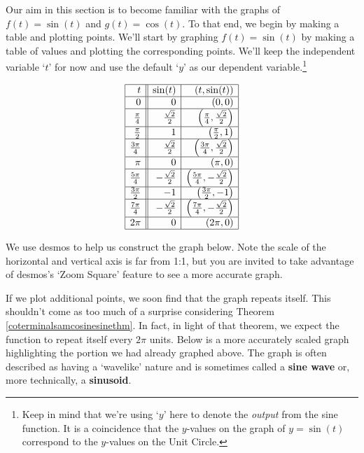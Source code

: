 \documentclass{ximera}
\begin{document}



Our aim in this section is to become familiar with the graphs of $f(t) = \sin(t)$ and $g(t) = \cos(t)$.  To that end, we begin by making a table and plotting points.  We'll start by graphing $f(t) = \sin(t)$ by making a table of values and plotting the corresponding points.  We'll keep the independent variable `$t$' for now and use the default `$y$' as our dependent variable.\footnote{Keep in mind that we're using `$y$' here to denote the \textit{output} from the sine function.  It is a coincidence that the $y$-values on the graph of $y=\sin(t)$ correspond to the $y$-values on the Unit Circle.}  

\[ \begin{array}{|r||r|r|} \hline
t & \sin(t) & (t,\sin(t)) \\ \hline
0  & 0 & (0, 0) \\ \hline
\frac{\pi}{4}  & \frac{\sqrt{2}}{2} & \left(\frac{\pi}{4}, \frac{\sqrt{2}}{2}\right) \\ \hline 
\frac{\pi}{2}  & 1 & \left(\frac{\pi}{2}, 1\right) \\ \hline 
\frac{3\pi}{4}  & \frac{\sqrt{2}}{2} & \left(\frac{3\pi}{4}, \frac{\sqrt{2}}{2}\right) \\ \hline 
\pi & 0 & (\pi, 0) \\ \hline 
\frac{5\pi}{4}  & -\frac{\sqrt{2}}{2} & \left(\frac{5\pi}{4}, -\frac{\sqrt{2}}{2}\right) \\  \hline 
\frac{3\pi}{2}  & -1 & \left(\frac{3\pi}{2}, -1 \right) \\ \hline 
\frac{7\pi}{4}  & -\frac{\sqrt{2}}{2} & \left(\frac{7\pi}{4}, -\frac{\sqrt{2}}{2}\right) \\  \hline 
2\pi  & 0 & (2\pi, 0) \\ \hline
\end{array} \] 

We use desmos to help us construct the graph below. Note the scale of the horizontal and vertical axis is far from 1:1, but you are invited to take advantage of desmos's `Zoom Square' feature to see a more accurate graph.

\begin{center}
\end{center}

If we plot additional points, we soon find that the graph repeats itself.   This shouldn't come as too much of a surprise considering Theorem \ref{coterminalsamcosinesinethm}.  In fact, in light of that theorem, we expect the function to repeat itself every $2\pi$ units.  Below is a more accurately scaled graph highlighting the portion we had already graphed above.  The graph is often described as having a `wavelike' nature and is sometimes called a  \textbf{sine wave} or, more technically, a \textbf{sinusoid}.
\end{document}
